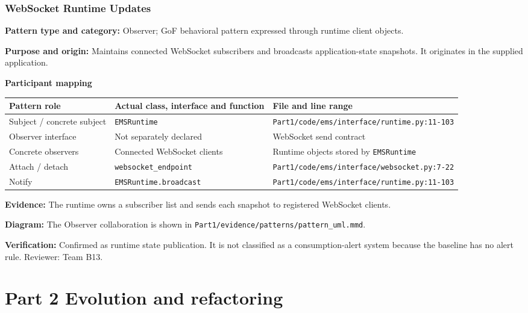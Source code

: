\documentclass[11pt,a4paper]{article}
\newcommand{\entry}[2]{\textbf{#1:} #2\par}
\newcommand{\codepath}[1]{\nolinkurl{#1}}
\begin{document}
\subsubsection{WebSocket Runtime Updates}
\entry{Pattern type and category}{Observer; GoF behavioral pattern expressed through runtime client objects.}
\entry{Purpose and origin}{Maintains connected WebSocket subscribers and broadcasts application-state snapshots. It originates in the supplied application.}
\textbf{Participant mapping}\par
\begin{tabularx}{\linewidth}{@{}lXX@{}}
\toprule
Pattern role & Actual class, interface and function & File and line range\\
\midrule
Subject / concrete subject & \codepath{EMSRuntime} & \codepath{Part1/code/ems/interface/runtime.py:11-103}\\
Observer interface & Not separately declared & WebSocket send contract\\
Concrete observers & Connected WebSocket clients & Runtime objects stored by \codepath{EMSRuntime}\\
Attach / detach & \codepath{websocket_endpoint} & \codepath{Part1/code/ems/interface/websocket.py:7-22}\\
Notify & \codepath{EMSRuntime.broadcast} & \codepath{Part1/code/ems/interface/runtime.py:11-103}\\
\bottomrule
\end{tabularx}
\entry{Evidence}{The runtime owns a subscriber list and sends each snapshot to registered WebSocket clients.}
\entry{Diagram}{The Observer collaboration is shown in \codepath{Part1/evidence/patterns/pattern_uml.mmd}.}
\entry{Verification}{Confirmed as runtime state publication. It is not classified as a consumption-alert system because the baseline has no alert rule. Reviewer: Team B13.}

\section{Part 2 Evolution and refactoring}
\end{document}
